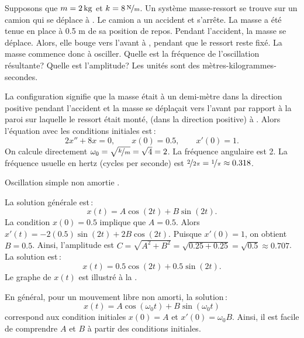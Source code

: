 \begin{example}
Supposons que $m=\unit[2]{kg}$ et $k=\unitfrac[8]{N}{m}$.  Un système masse-ressort se trouve sur un camion qui se déplace à  .
Le camion a un accident et s'arrête.  La masse a été tenue en place à 0.5 m de sa position de repos. Pendant l'accident, la masse se déplace. Alors, elle bouge vers l'avant à , pendant que le ressort reste fixé.   La masse commence donc à osciller. Quelle est la fréquence de l'oscillation résultante? Quelle est l'amplitude? Les unités sont des  mètres-kilogrammes-secondes.

La configuration signifie que la masse était à un demi-mètre dans la 
direction positive pendant l'accident et
 la masse se déplaçait vers l'avant par rapport à la paroi sur laquelle le ressort était monté,
(dans la direction positive) à .  Alors l'équation avec les conditions initiales est\,: 
\begin{equation*}
2 x'' + 8 x = 0 , \qquad x(0) = 0.5, \qquad x'(0) = 1.
\end{equation*}
On calcule directement $\omega_0 = \sqrt{\nicefrac{k}{m}} = \sqrt{4} = 2$.
La fréquence angulaire est 2.  La fréquence usuelle en hertz (cycles per
seconde) est $\nicefrac{2}{2\pi} = \nicefrac{1}{\pi} \approx 0.318$.

\begin{mywrapfig}[15]{3.25in}
\capstart
{}
\caption{Oscillation simple non amortie .\label{mv:undampedfig}}
\end{mywrapfig}

La solution générale est\,: 
\begin{equation*}
x(t) = A \cos (2t) + B \sin (2t) .
\end{equation*}
La condition $x(0) = 0.5$ implique que $A = 0.5$.  Alors $x'(t) = - 2(0.5) \sin (2t)
+ 2B \cos (2t)$.
Puisque $x'(0) = 1$, on obtient $B = 0.5$.  Ainsi, l'amplitude est
$C = \sqrt{A^2+B^2} = \sqrt{0.25+0.25} = \sqrt{0.5} \approx 0.707$.  La solution est\,: 
\begin{equation*}
x(t) = 0.5 \cos (2t) + 0.5 \sin (2t) .
\end{equation*}
Le graphe de  $x(t)$ est illustré à la  .
\end{example}

En général, pour un mouvement libre non amorti, la solution\,: 
\begin{equation*}
x(t) = A \cos (\omega_0 t) + B \sin (\omega_0 t) 
\end{equation*}
correspond aux condition initiales $x(0) = A$ et $x'(0) = \omega_0 B$.
Ainsi, il est facile de comprendre $A$ et $B$ à partir des conditions initiales. 

